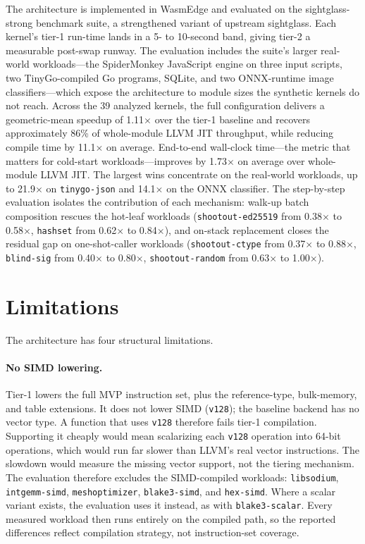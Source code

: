 The architecture is implemented in WasmEdge and evaluated on the sightglass-strong benchmark suite, a strengthened variant of upstream sightglass. Each kernel's tier-1 run-time lands in a 5- to 10-second band, giving tier-2 a measurable post-swap runway. The evaluation includes the suite's larger real-world workloads---the SpiderMonkey JavaScript engine on three input scripts, two TinyGo-compiled Go programs, SQLite, and two ONNX-runtime image classifiers---which expose the architecture to module sizes the synthetic kernels do not reach. Across the 39 analyzed kernels, the full configuration delivers a geometric-mean speedup of 1.11$\times$ over the tier-1 baseline and recovers approximately 86\% of whole-module LLVM JIT throughput, while reducing compile time by 11.1$\times$ on average. End-to-end wall-clock time---the metric that matters for cold-start workloads---improves by 1.73$\times$ on average over whole-module LLVM JIT. The largest wins concentrate on the real-world workloads, up to 21.9$\times$ on \texttt{tinygo-json} and 14.1$\times$ on the ONNX classifier. The step-by-step evaluation isolates the contribution of each mechanism: walk-up batch composition rescues the hot-leaf workloads (\texttt{shootout-ed25519} from 0.38$\times$ to 0.58$\times$, \texttt{hashset} from 0.62$\times$ to 0.84$\times$), and on-stack replacement closes the residual gap on one-shot-caller workloads (\texttt{shootout-ctype} from 0.37$\times$ to 0.88$\times$, \texttt{blind-sig} from 0.40$\times$ to 0.80$\times$, \texttt{shootout-random} from 0.63$\times$ to 1.00$\times$).

\section{Limitations}
\label{sec:conclusion:limitations}

The architecture has four structural limitations.

\paragraph{No SIMD lowering.} Tier-1 lowers the full MVP instruction set, plus the reference-type, bulk-memory, and table extensions. It does not lower SIMD (\texttt{v128}); the baseline backend has no vector type. A function that uses \texttt{v128} therefore fails tier-1 compilation. Supporting it cheaply would mean scalarizing each \texttt{v128} operation into 64-bit operations, which would run far slower than LLVM's real vector instructions. The slowdown would measure the missing vector support, not the tiering mechanism. The evaluation therefore excludes the SIMD-compiled workloads: \texttt{libsodium}, \texttt{intgemm-simd}, \texttt{meshoptimizer}, \texttt{blake3-simd}, and \texttt{hex-simd}. Where a scalar variant exists, the evaluation uses it instead, as with \texttt{blake3-scalar}. Every measured workload then runs entirely on the compiled path, so the reported differences reflect compilation strategy, not instruction-set coverage.

